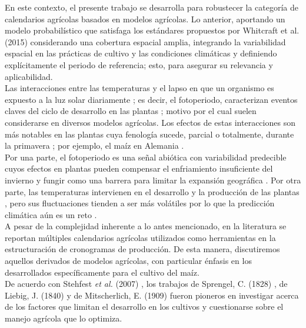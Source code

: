 En este contexto, el presente trabajo se desarrolla para robustecer la categoría de calendarios agrícolas basados en modelos agrícolas. Lo anterior, aportando un modelo probabilístico que satisfaga los estándares propuestos por Whitcraft et al. (2015) \cite{Whitcraft_2015} considerando una cobertura espacial amplia, integrando la variabilidad espacial en las prácticas de cultivo y las condiciones climáticas y definiendo explícitamente el periodo de referencia; esto, para asegurar su relevancia y aplicabilidad.\\



Las interacciones entre las temperaturas y el lapso en que un organismo es expuesto a la luz solar diariamente \cite{CLELAND_2007}; es decir, el fotoperiodo, caracterizan eventos claves del ciclo de desarrollo en las plantas \cite{Tarascio_2026}; motivo por el cual suelen considerarse en diversos modelos agrícolas. Los efectos de estas interacciones son más notables en las plantas cuya fenología sucede, parcial o totalmente, durante la primavera \cite{Tarascio_2026}; por ejemplo, el maíz en Alemania \cite{Liu_2025, Parker_2016}. \\


Por una parte, el fotoperiodo es una señal abiótica con variabilidad predecible \cite{Li_2025_photo} cuyos efectos en plantas pueden compensar el enfriamiento insuficiente del invierno y fungir como una barrera para limitar la expansión geográfica \cite{Tarascio_2026}. Por otra parte, las temperaturas intervienen en el desarrollo y la producción de las plantas \cite{BAHUGUNA_2015}, pero sus fluctuaciones tienden a ser más volátiles por lo que la predicción climática aún es un reto \cite{Krishnamurthy_2019, Materia_2024}.\\  
 
 
A pesar de la complejidad inherente a lo antes mencionado, en la literatura se reportan múltiples calendarios agrícolas utilizados como herramientas en la estructuración de cronogramas de producción. De esta manera, discutiremos aquellos derivados de modelos agrícolas, con particular énfasis en los desarrollados específicamente para el cultivo del maíz.\\

De acuerdo con Stehfest \textit{et al.} (2007) \cite{STEHFEST_2007}, los trabajos de Sprengel, C. (1828) \cite{Sprengel_1828}, de Liebig, J. (1840) \cite{Liebig_1840} y de Mitscherlich, E. (1909) \cite{Mitscherlich_1909} fueron pioneros en investigar  acerca de los factores que limitan el desarrollo en los cultivos y cuestionarse sobre el manejo agrícola que lo optimiza.\\


